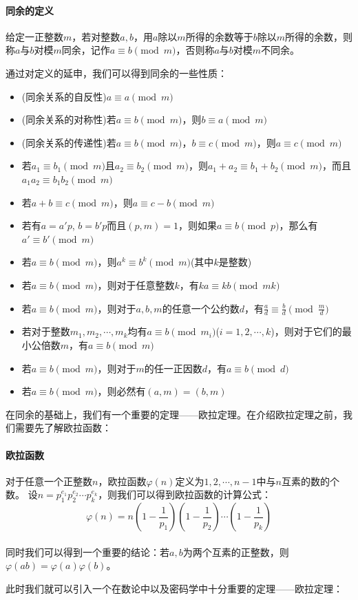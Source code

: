 \documentclass{article}
\numberwithin{equation}{subsubsection}
\begin{document}
\paragraph{\textbf{同余的定义}}
给定一正整数$m$，若对整数$a,b$，用$a$除以$m$所得的余数等于$b$除以$m$所得的余数，则称$a$与$b$对模$m$同余，记作$a\equiv b\pmod{m}$，否则称$a$与$b$对模$m$不同余。\par
通过对定义的延申，我们可以得到同余的一些性质：
\begin{itemize}
    \item (同余关系的自反性)$a\equiv a\pmod{m}$
    \item (同余关系的对称性)若$a\equiv b\pmod{m}$，则$b\equiv a\pmod{m}$
    \item (同余关系的传递性)若$a\equiv b\pmod{m}$，$b\equiv c\pmod{m}$，则$a\equiv c\pmod{m}$
    \item 若$a_1\equiv b_1\pmod{m}$且$a_2\equiv b_2\pmod{m}$，则$a_1+a_2\equiv b_1+b_2\pmod{m}$，而且$a_1a_2\equiv b_1b_2\pmod{m}$
    \item 若$a+b\equiv c\pmod{m}$，则$a\equiv c-b\pmod{m}$
    \item 若有$a=a'p$, $b=b'p$而且$(p,m)=1$，则如果$a\equiv b\pmod{p}$，那么有$a'\equiv b'\pmod{m}$
    \item 若$a\equiv b\pmod{m}$，则$a^k\equiv b^k\pmod{m}$(其中$k$是整数)
    \item 若$a\equiv b\pmod{m}$，则对于任意整数$k$，有$ka\equiv kb\pmod{mk}$
    \item 若$a\equiv b\pmod{m}$，则对于$a,b,m$的任意一个公约数$d$，有$\frac{a}{d}\equiv \frac{b}{d}\pmod{\frac{m}{d}}$
    \item 若对于整数$m_1,m_2,\cdots,m_k$均有$a\equiv b\pmod{m_i}$($i=1,2,\cdots,k$)，则对于它们的最小公倍数$m$，有$a\equiv b\pmod{m}$
    \item 若$a\equiv b\pmod{m}$，则对于$m$的任一正因数$d$，有$a\equiv b\pmod{d}$
    \item 若$a\equiv b\pmod{m}$，则必然有$(a,m)=(b,m)$
\end{itemize}\par
在同余的基础上，我们有一个重要的定理——欧拉定理。在介绍欧拉定理之前，我们需要先了解欧拉函数：
\paragraph{\textbf{欧拉函数}}
对于任意一个正整数$n$，欧拉函数$\varphi(n)$定义为$1,2,\cdots,n-1$中与$n$互素的数的个数。
设$n=p_1^{e_1}p_2^{e_2}\cdots p_k^{e_k}$，则我们可以得到欧拉函数的计算公式：
\begin{equation}
    \varphi(n)=n\left(1-\frac{1}{p_1}\right)\left(1-\frac{1}{p_2}\right)\cdots\left(1-\frac{1}{p_k}\right)
    \nonumber
\end{equation}\\
同时我们可以得到一个重要的结论：若$a,b$为两个互素的正整数，则$\varphi(ab)=\varphi(a)\varphi(b)$。\par
此时我们就可以引入一个在数论中以及密码学中十分重要的定理——欧拉定理：
\end{document}

